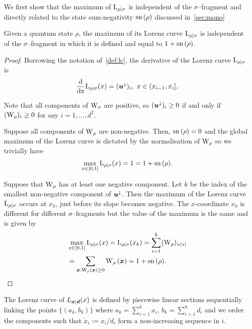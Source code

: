 \documentclass[pra,
aps,
twocolumn,
superscriptaddress,
groupedaddress,
nofootinbib,
reprint
]{revtex4-1}
\begin{document}
We first show that the maximum of ${{\rm{L}}_{\rho|\sigma}}$ is independent of the $\sigma$--fragment and directly related to the state sum-negativity ${{\rm{sn}}\left(\rho\right)}$ discussed in~\cref{sec:mono}
\begin{lemma}\label{lem:lcmax}
	Given a quantum state $\rho$, the maximum of its Lorenz curve ${{\rm{L}}_{\rho|\sigma}}$ is independent of the $\sigma$--fragment in which it is defined and equal to $1+{{\rm{sn}}\left(\rho\right)}$.
\end{lemma}
\begin{proof}
	Borrowing the notation of~\cref{def:lc}, the derivative of the Lorenz curve ${{\rm{L}}_{\rho|\sigma}}$ is
	\begin{equation}
		\frac{\rm{d}}{\rm{d}x} {{\rm{L}}_{\rho|\sigma}}(x) = (\bm{u}^\downarrow)_i,\ x \in (x_{i-1}, x_i],
	\end{equation}

	Note that all components of $\W{\sigma}$ are positive, so $(\bm{u}^\downarrow)_i \geq 0$ if and only if $(\W{\rho})_i \geq 0$ for any $i=1,\dots,d^2$.

	Suppose all components of $\W{\rho}$ are non-negative.
	Then, ${{\rm{sn}}\left(\rho\right)}=0$ and the global maximum of the Lorenz curve is dictated by the normalisation of $\W{\rho}$ so we trivially have
	\begin{equation}
		\max_{x\in[0,1]}{{{\rm{L}}_{\rho|\sigma}}(x)} = 1 = 1 + {{\rm{sn}}\left(\rho\right)}.
	\end{equation}
	
	Suppose that $\W{\rho}$ has at least one negative component.
	Let $k$ be the index of the smallest non-negative component of $\bm{u}^\downarrow$.
	Then the maximum of the Lorenz curve ${{\rm{L}}_{\rho|\sigma}}$ occurs at $x_k$, just before its slope becomes negative. 
	The $x$-coordinate $x_k$ is different for different $\sigma$--fragments but the value of the maximum is the same and is given by
	\begin{align}
		&\max_{x\in[0,1]}{\lc{\rho}{\sigma}(x)}
		= \lc{\rho}{\sigma}(x_k)
		= \sum\limits_{i=1}^k (\W{\rho})_{\pi(i)} \\
		&= \sum\limits_{\bmx: \W[\bmx]{\rho} \geq 0} \W[\bmx]{\rho}
		= 1 + \sn{\rho}.
	\end{align}
	
\end{proof}
The Lorenz curve of $L_{\bm{x} |\bm{d}}(x)$ is defined by piecewise linear sections sequentially linking the points $\{ (a_k,b_k)\}$ where $a_k = \sum_{i=1}^k x_i$, $ b_k = \sum_{i=1}^k d_i$ and we order the components such that $\tilde{x}_i:=x_i / d_i$ form a non-increasing sequence in $i$.
\end{document}
